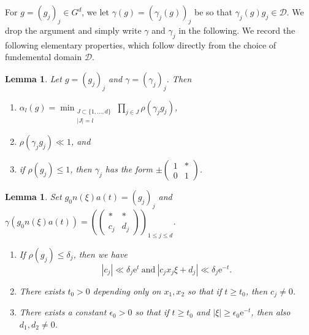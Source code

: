\documentclass[12pt]{amsart}
\newtheorem{lem}[thm]{Lemma}
\theoremstyle{definition}
\theoremstyle{remark}
\numberwithin{equation}{section}
\newcommand{\e}{\mathrm{e}}
\newcommand{\cD}{\mathcal{D}}
\begin{document}
For $g = (g_j)_j\in G^d$, we let $\gamma(g) = (\gamma_j(g))_j$ be so that $\gamma_j(g) g_j \in \cD$. We drop the argument and simply write $\gamma$ and $\gamma_j$ in the following.
We record the following elementary properties, which follow directly from the choice of fundemental domain $\cD$.
\begin{lem}
  \label{lem:shortestvector}
  Let $g = (g_j)_j$ and $\gamma = (\gamma_j)_j$.
  Then
  \begin{enumerate}[{\rm (i)}]
  \item $\alpha_l(g) = \min_{\substack{J \subset \{1, \dots, d\} \\ |J| = l}} \prod_{j \in J} \rho(\gamma_j g_j)$,
    
  \item $\rho(\gamma_j g_j) \ll 1$, and
    
  \item if $\rho(g_j) \leq 1$, then $\gamma_j$ has the form $
  \pm \begin{pmatrix}
    1 & * \\
    0 & 1
  \end{pmatrix}
  $.
  \end{enumerate}
\end{lem}

\begin{lem}
  \label{lem:basicfundamentaldomain}
  Set $g_0 n(\xi) a(t) = (g_j)_j$ and $\gamma( g_0 n(\xi) a(t)) = \left(
  \begin{pmatrix}
    * & * \\
    c_j & d_j
  \end{pmatrix}
 \right)_{\!\!1\leq j\leq d}$.
  \begin{enumerate}[{\rm (i)}]    
  \item
    If $\rho(g_j) \leq \delta_j$, then we have
    \begin{equation}
      \label{eq:cjdjbounds}
      |c_j| \ll \delta_j \e^t\ \mathrm{and\ } |c_j x_j \xi + d_j | \ll \delta_j \e^{-t}.
    \end{equation}

  \item There exists $t_0 > 0$ depending only on $x_1, x_2$ so that if $t \geq t_0$, then $c_j \neq 0$.
    
  \item There exists a constant $\epsilon_0 > 0$ so that if $t \geq t_0$ and $|\xi| \geq \epsilon_0 \e^{-t}$, then also $d_1, d_2 \neq 0$. 
  \end{enumerate}
\end{lem}
\end{document}
